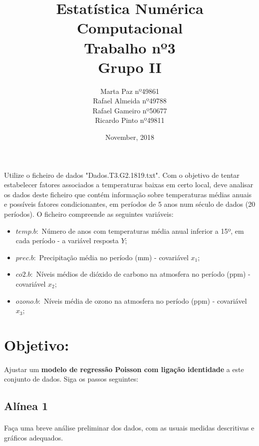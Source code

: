 \documentclass{article}
\title{Estatística Numérica Computacional\\Trabalho nº3\\Grupo II}
\author{Marta Paz nº49861\\
		Rafael Almeida nº49788\\
		Rafael Gameiro nº50677\\
		Ricardo Pinto nº49811\\
}
\date{November, 2018}
\begin{document}
	\maketitle
	\newpage
	
	\noindent Utilize o ficheiro de dados "Dados.T3.G2.1819.txt". Com o objetivo de tentar estabelecer fatores associados a temperaturas baixas em certo local, deve analisar os dados deste ficheiro que contém informação sobre temperaturas médias anuais e possíveis fatores condicionantes, em períodos de 5 anos num século de dados (20 períodos). O ficheiro compreende as seguintes variáveis:
	
	\begin{itemize}
		\item $temp.b:$ Número de anos com temperaturas média anual inferior a 15º, em cada período - a variável resposta $Y$;
		\item $prec.b:$ Precipitação média no período (mm) - covariável $x_1$;	
		\item $co2.b:$ Níveis médios de dióxido de carbono na atmosfera no período (ppm) - covariável $x_2$;
		\item $ozono.b:$ Níveis média de ozono na atmosfera no período (ppm) - covariável $x_3$;
	\end{itemize}
	
		\section*{Objetivo:}
		\paragraph{}
			Ajustar um \textbf{modelo de regressão Poisson com ligação identidade} a este conjunto de dados. Siga os passos seguintes:

		\subsection*{Alínea 1}
			\paragraph{}
				Faça uma breve análise preliminar dos dados, com as usuais medidas descritivas e gráficos adequados.
\end{document}
